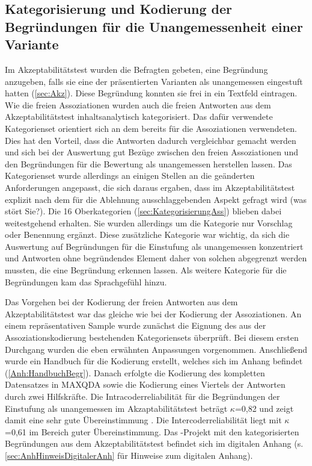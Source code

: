 \subsection{Kategorisierung und Kodierung der Begründungen für die Unangemessenheit einer Variante}
\label{sec:KategorisierungAkz}
Im Akzeptabilitätstest wurden die Befragten gebeten, eine Begründung anzugeben, falls sie eine der präsentierten Varianten als unangemessen eingestuft hatten (\autoref{sec:Akz}). 
Diese Begründung konnten sie frei in ein Textfeld eintragen. 
Wie die freien Assoziationen wurden auch die freien Antworten aus dem Akzeptabilitätstest inhaltsanalytisch kategorisiert. 
Das dafür verwendete Kategorienset orientiert sich an dem bereits für die Assoziationen verwendeten.
Dies hat den Vorteil, dass die Antworten dadurch vergleichbar gemacht werden und sich bei der Auswertung gut Bezüge zwischen den freien Assoziationen und den Begründungen für die Bewertung als unangemessen herstellen lassen. 
Das Kategorienset wurde allerdings an einigen Stellen an die geänderten Anforderungen angepasst, die sich daraus ergaben, dass im Akzeptabilitätstest explizit nach dem für die Ablehnung ausschlaggebenden Aspekt gefragt wird (\glqq was stört Sie?\grqq). 
Die 16 Oberkategorien (\autoref{sec:KategorisierungAss}) blieben dabei weitestgehend erhalten. 
Sie wurden allerdings um die Kategorie \glqq nur Vorschlag oder Benennung\grqq{} ergänzt. 
Diese zusätzliche Kategorie war wichtig, da sich die Auswertung auf Begründungen für die Einstufung als unangemessen konzentriert und Antworten ohne begründendes Element daher von solchen abgegrenzt werden mussten, die eine Begründung erkennen lassen. 
Als weitere Kategorie für die Begründungen kam das \glqq Sprachgefühl\grqq{} hinzu. 

Das Vorgehen bei der Kodierung der freien Antworten aus dem Akzeptabilitätstest war das gleiche wie bei der Kodierung der Assoziationen. 
An einem repräsentativen Sample wurde zunächst die Eignung des aus der Assoziationskodierung bestehenden Kategoriensets überprüft. 
Bei diesem ersten Durchgang wurden die eben erwähnten Anpassungen vorgenommen. 
Anschließend wurde ein Handbuch für die Kodierung erstellt, welches sich im Anhang befindet (\autoref{Anh:HandbuchBegr}). 
Danach erfolgte die Kodierung des kompletten Datensatzes in MAXQDA sowie die Kodierung eines Viertels der Antworten durch zwei Hilfskräfte. 
Die Intracoderreliabilität für die Begründungen der Einstufung als unangemessen im Akzaptabilitätstest beträgt $\kappa$=0,82 und zeigt damit eine sehr gute Übereinstimmung \citep[s.][346]{Doring2016}. 
Die Intercoderreliabilität liegt mit $\kappa$=0,61 im Bereich guter Übereinstimmung. 
Das \citeauthor{MAXQDA.19892018}-Projekt mit den kategorisierten Begründungen aus dem Akzeptabilitätstest befindet sich im digitalen Anhang (s. \autoref{sec:AnhHinweisDigitalerAnh} für Hinweise zum digitalen Anhang). 
